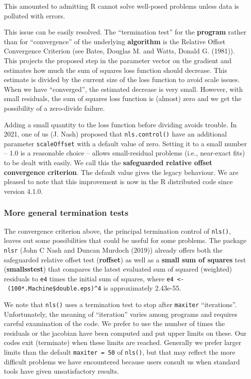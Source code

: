 This amounted to admitting R cannot solve well-posed problems unless data is polluted
with errors.

This issue can be easily resolved. The ``termination test'' for the \textbf{program} rather than for
``convergence'' of the underlying \textbf{algorithm} is the Relative Offset
Convergence Criterion (see Bates, Douglas M. and Watts, Donald G. (1981)). This projects the proposed step
in the parameter vector on the gradient
and estimates how much the sum of squares loss function should decrease.
This estimate is divided
by the current size of the loss function to avoid scale issues.
When we have ``converged'', the estimated
decrease is very small. However, with small residuals,
the sum of squares loss function is (almost) zero and we get the possibility of a
zero-divide failure.

Adding a small quantity to the loss function before dividing avoids trouble.
In 2021, one of us (J. Nash) proposed that \texttt{nls.control()} have an additional
parameter \texttt{scaleOffset}
with a default value of zero. Setting it to a small number -- 1.0 is
a reasonable choice -- allows small-residual problems (i.e., near-exact fits)
to be dealt with easily. We call this the
\textbf{safeguarded relative offset convergence criterion}. The default value
gives the legacy behaviour. We are pleased to note that this improvement is
now in the R distributed code since version 4.1.0.

\hypertarget{more-general-termination-tests}{%
\subsubsection{More general termination tests}\label{more-general-termination-tests}}

The convergence criterion above, the principal termination control of \texttt{nls()},
leaves out some possibilities that could be useful for some problems. The
package \texttt{nlsr} (John C Nash and Duncan Murdoch (2019)) already offers both
the safeguarded relative offset test (\textbf{roffset}) as well as a \textbf{small sum of
squares} test (\textbf{smallsstest}) that compares the latest evaluated sum of squared
(weighted) residuals to \texttt{e4} times the initial sum of squares, where
\texttt{e4\ \textless{}-\ (100*.Machine\$double.eps)\^{}4} is approximately 2.43e-55.

We note that \texttt{nls()} uses a termination test to stop after \texttt{maxiter} ``iterations''.
Unfortunately, the meaning of ``iteration'' varies among programs and requires
careful examination of the
code. We prefer to use the number of times the residuals or the jacobian have
been computed and put upper limits on these. Our codes exit (terminate) when
these limits are reached. Generally we prefer larger limits than the default
\texttt{maxiter\ =\ 50} of \texttt{nls()},
but that may reflect the more difficult problems we have encountered because
users consult us when standard tools have given unsatisfactory results.

